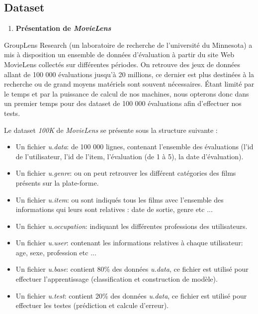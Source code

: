 \subsection{Dataset}
\begin{enumerate}[nosep,label=\textbf{\arabic*)}]
	\item \textbf{Présentation de \textit{MovieLens}}
\end{enumerate}\mbox{} \indent GroupLens Research (un laboratoire de recherche de l’université du Minnesota) a mis à disposition un ensemble de données d’évaluation à partir du site Web MovieLens collectés sur différentes périodes.
On retrouve des jeux de données allant de 100 000 évaluations jusqu'à 20 millions, ce dernier est plus destinées à la recherche ou de grand moyens matériels sont souvent nécessaires.
Étant limité par le temps et par la puissance de calcul de nos machines, nous
opterons donc dans un premier temps pour des dataset de 100 000 évaluations afin d’effectuer nos tests.

Le dataset \textit{100K} de \textit{MovieLens} se présente sous la structure suivante :
\begin{itemize}
	\item Un fichier \textit{u.data}: de 100 000 lignes, contenant l’ensemble des évaluations (l’id de l’utilisateur, l’id de l’item, l’évaluation (de 1 à 5), la date d’évaluation).
	\item  Un fichier \textit{u.genre}: ou on peut retrouver les différent catégories des films présents sur la plate-forme.
	\item  Un fichier \textit{u.item}: ou sont indiqués tous les films avec l’ensemble des informations qui leurs sont relatives : date de sortie, genre etc ...
	\item Un fichier \textit{u.occupation}: indiquant les différentes professions des utilisateurs.
	\item  Un fichier \textit{u.user}: contenant les informations relatives à chaque utilisateur: age, sexe, profession etc ...
	\item  Un fichier \textit{u.base}: contient 80\%  des données \textit{u.data}, ce fichier est utilisé pour effectuer l'apprentissage (classification et construction de modèle).
	\item  Un fichier \textit{u.test}: contient 20\%  des données \textit{u.data}, ce fichier est utilisé pour effectuer les testes (prédiction et calcule d'erreur).
\end{itemize}
